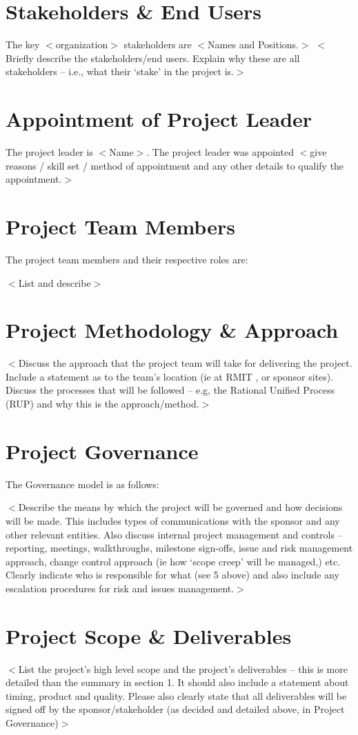 \documentclass[a4paper]{article}
\begin{document}
\section{Stakeholders \& End Users}
The key $<$organization$>$ stakeholders are $<$Names and Positions.$>$ $<$Briefly describe the stakeholders/end users. Explain why these are all stakeholders – i.e., what their ‘stake’ in the project is.$>$

\section{Appointment of Project Leader}
The project leader is $<$Name$>$. The project leader was appointed $<$give reasons / skill set / method of appointment and any other details to qualify the appointment.$>$

\section{Project Team Members}
The project team members and their respective roles are:

$<$List and describe$>$

\section{Project Methodology \& Approach}
$<$Discuss the approach that the project team will take for delivering the project. Include a statement as to the team’s location (ie at RMIT , or sponsor sites). Discuss the processes that will be followed – e.g, the Rational Unified Process (RUP) and why this is the approach/method.$>$

\section{Project Governance}
The Governance model is as follows:

$<$Describe the means by which the project will be governed and how decisions will be made. This includes types of communications with the sponsor and any other relevant entities. Also discuss internal project management and controls – reporting, meetings, walkthroughs, milestone sign-offs, issue and risk management approach, change control approach (ie how ‘scope creep’ will be managed,) etc. Clearly indicate who is responsible for what (see 5 above) and also include any escalation procedures for risk and issues management.$>$

\section{Project Scope \& Deliverables}
$<$List the project’s high level scope and the project’s deliverables – this is more detailed than the summary in section 1. It should also include a statement about timing, product and quality. Please also clearly state that all deliverables will be signed off by the sponsor/stakeholder (as decided and detailed above, in Project Governance)$>$
\end{document}
